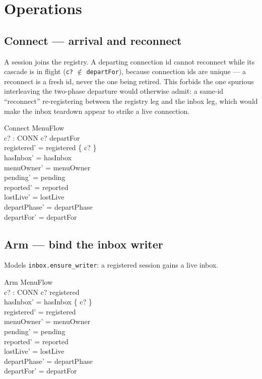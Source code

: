 \documentclass[a4paper,10pt,fleqn]{article}
\begin{document}
\section{Operations}

\subsection{Connect --- arrival and reconnect}

A session joins the registry. A departing connection id cannot reconnect while
its cascade is in flight (\texttt{c?} $\notin$ \texttt{departFor}), because
connection ids are unique --- a reconnect is a fresh id, never the one being
retired. This forbids the one spurious interleaving the two-phase departure
would otherwise admit: a same-id ``reconnect'' re-registering between the
registry leg and the inbox leg, which would make the inbox teardown appear to
strike a live connection.

\begin{schema}{Connect}
  \Delta MenuFlow \\
  c? : CONN
\where
  c? \notin departFor \\
  registered' = registered \cup \{ c? \} \\
  hasInbox' = hasInbox \\
  menuOwner' = menuOwner \\
  pending' = pending \\
  reported' = reported \\
  lostLive' = lostLive \\
  departPhase' = departPhase \\
  departFor' = departFor
\end{schema}

\subsection{Arm --- bind the inbox writer}

Models \texttt{inbox.ensure\_writer}: a registered session gains a live inbox.

\begin{schema}{Arm}
  \Delta MenuFlow \\
  c? : CONN
\where
  c? \in registered \\
  hasInbox' = hasInbox \cup \{ c? \} \\
  registered' = registered \\
  menuOwner' = menuOwner \\
  pending' = pending \\
  reported' = reported \\
  lostLive' = lostLive \\
  departPhase' = departPhase \\
  departFor' = departFor
\end{schema}
\end{document}
